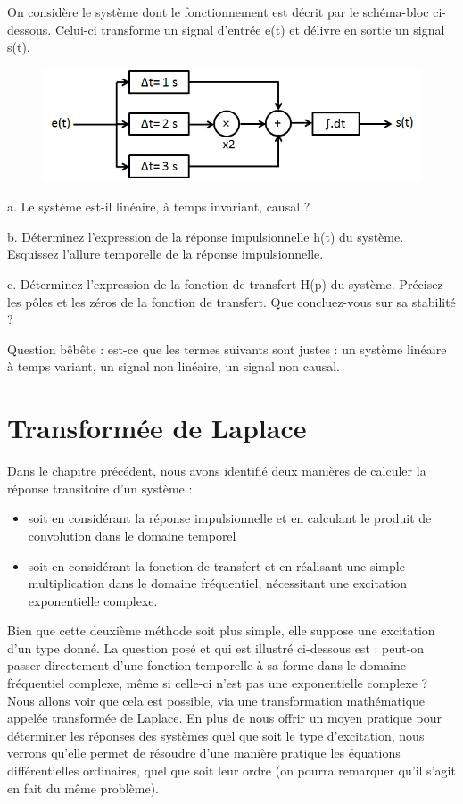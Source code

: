 \documentclass[]{report}
\begin{document}
	On considère le système dont le fonctionnement est décrit par le schéma-bloc ci-dessous. Celui-ci transforme un signal d'entrée e(t) et délivre en sortie un signal s(t). 
	
	\begin{figure}[h!]
		\centering
		\includegraphics[scale=0.5]{images/Exo_2_6.jpg} 
	\end{figure}
	
	a. Le système est-il linéaire, à temps invariant, causal ?
	
	b. Déterminez l'expression de la réponse impulsionnelle h(t) du système. Esquissez l'allure temporelle de la réponse impulsionnelle. 
	
	c. Déterminez l'expression de la fonction de transfert H(p) du système. Précisez les pôles et les zéros de la fonction de transfert. Que concluez-vous sur sa stabilité ?
	
	\vspace{1\baselineskip}
	
	Question bêbête : est-ce que les termes suivants sont justes : un système linéaire à temps variant, un signal non linéaire, un signal non causal.


	\newpage
	
	
\chapter{Transformée de Laplace}	
	
	
	Dans le chapitre précédent, nous avons identifié deux manières de calculer la réponse transitoire d'un système :
	\begin{itemize}
		\item soit en considérant la réponse impulsionnelle et en calculant le produit de convolution dans le domaine temporel
		\item soit en considérant la fonction de transfert et en réalisant une simple multiplication dans le domaine fréquentiel, nécessitant une excitation exponentielle complexe.
	\end{itemize}

	Bien que cette deuxième méthode soit plus simple, elle suppose une excitation d'un type donné. La question posé et qui est illustré ci-dessous est : peut-on passer directement d'une fonction temporelle à sa forme dans le domaine fréquentiel complexe, même si celle-ci n'est pas une exponentielle complexe ? Nous allons voir que cela est possible, via une transformation mathématique appelée transformée de Laplace. En plus de nous offrir un moyen pratique pour déterminer les réponses des systèmes quel que soit le type d'excitation, nous verrons  qu'elle permet de résoudre d'une manière pratique les équations différentielles ordinaires, quel que soit leur ordre (on pourra remarquer qu'il s'agit en fait du même problème). 
	
\end{document}
